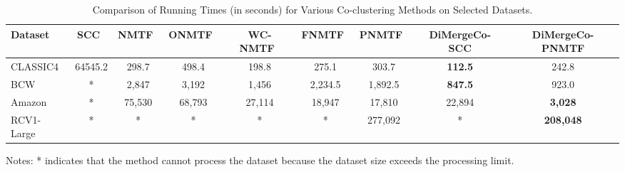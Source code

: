 \documentclass[journal]{IEEEtran}
\theoremstyle{definition}
\theoremstyle{remark} %
\renewcommand{\cite}[1]{~\autocite{#1}}
\begin{document}
\begin{table}[htbp]
    \centering
    \caption{Comparison of Running Times (in seconds) for Various Co-clustering Methods on Selected Datasets.}
    \label{tab:running-time}
    \begin{threeparttable}
        \begin{tabular}{@{} l cccccccc @{}}
            \toprule
            Dataset    & SCC\cite{dhillon2001CoclusteringDocumentsWords}
                       & NMTF\cite{long2005CoclusteringBlockValue}
                       & ONMTF\cite{ding2006OrthogonalNonnegativeMatrix}
                       & WC-NMTF\cite{salah2018WordCooccurrenceRegularized}
                       & FNMTF\cite{kim2011FastNonnegativeMatrix}
                       & PNMTF\cite{chen2023ParallelNonNegativeMatrix}      & \textbf{DiMergeCo-SCC} & \textbf{DiMergeCo-PNMTF}                                                                  \\
            \midrule
            CLASSIC4   & 64545.2                                            & 298.7                  & 498.4                    & 198.8  & 275.1   & 303.7   & \textbf{112.5} & 242.8            \\
            BCW        & *                                                  & 2,847                  & 3,192                    & 1,456  & 2,234.5 & 1,892.5 & \textbf{847.5} & 923.0            \\
            Amazon     & *                                                  & 75,530                 & 68,793                   & 27,114 & 18,947  & 17,810  & 22,894         & \textbf{3,028}   \\
            RCV1-Large & *                                                  & *                      & *                        & *      & *       & 277,092 & *              & \textbf{208,048} \\
            \bottomrule
        \end{tabular}
        \begin{tablenotes}
            \small
            \item Notes: * indicates that the method cannot process the dataset because the dataset size exceeds the processing limit.
        \end{tablenotes}
    \end{threeparttable}
\end{table}
\end{document}
